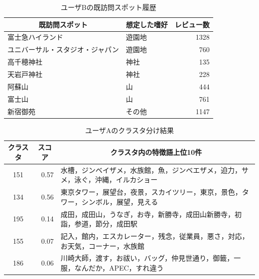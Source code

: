\documentclass{deimj}
\begin{document}
\begin{table}[t]
    \caption{ユーザBの既訪問スポット履歴}
    \label{table:ユーザBの既訪問スポット履歴}
    \centering
    \begin{tabular}{l|l|r}
    \hline
    \multicolumn{1}{c|}{既訪問スポット} & \multicolumn{1}{c|}{想定した嗜好} & \multicolumn{1}{c}{レビュー数} \\ \hline
    富士急ハイランド                     & 遊園地                         & 1328                      \\
    ユニバーサル・スタジオ・ジャパン             & 遊園地                         & 760                       \\
    高千穂神社                        & 神社                          & 135                       \\
    天岩戸神社                        & 神社                          & 228                       \\
    阿蘇山                          & 山                           & 444                       \\
    富士山                          & 山                           & 761                       \\
    新宿御苑                         & その他                         & 1147                      \\ \hline
    \end{tabular}
\end{table}

\begin{table}[t]
    \caption{ユーザAのクラスタ分け結果}
    \label{table:ユーザAのクラスタ分け結果}
    \centering
    \begin{tabular}{c|r|l}
    \hline
    \multicolumn{1}{c|}{クラスタ} & \multicolumn{1}{c|}{スコア} & \multicolumn{1}{c}{クラスタ内の特徴語上位10件}         \\ \hline
    151                       & 0.57                     & 水槽，ジンベイザメ，水族館，魚，ジンベエザメ，迫力，サメ，泳ぐ，沖縄，イルカショー  \\
    134                       & 0.56                     & 東京タワー，展望台，夜景，スカイツリー，東京，景色，タワー，シンボル，展望，見える  \\
    195                       & 0.14                     & 成田，成田山，うなぎ，お寺，新勝寺，成田山新勝寺，初詣，参道，節分，成田駅      \\
    155                       & 0.07                     & 記入，館内，エスカレーター，残念，従業員，悪さ，対応，お天気，コーナー，水族館    \\
    186                       & 0.06                     & 川崎大師，渡す，お祓い，バッグ，仲見世通り，御籤，一服，なんだか，APEC，すれ違う \\ \hline
    \end{tabular}
\end{table}
\end{document}
